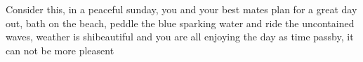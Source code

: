 Consider this, in a peaceful sunday, you and your best mates plan for a great day out, bath on the beach, peddle the blue sparking water and ride the uncontained waves, weather is shibeautiful and you are all enjoying the day as time passby, it can not be more pleasent 